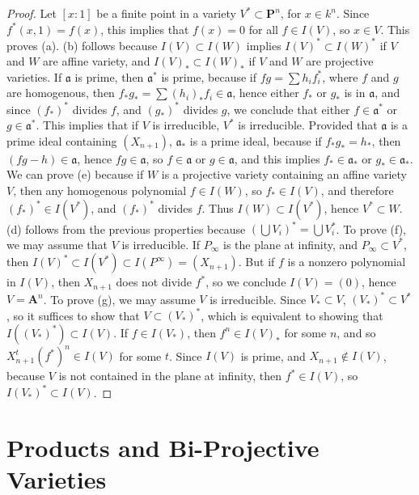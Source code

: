 \begin{proof}
    Let $[x:1]$ be a finite point in a variety $V^* \subset \mathbf{P}^n$, for $x \in k^n$. Since $f^*(x,1) = f(x)$, this implies that $f(x) = 0$ for all $f \in I(V)$, so $x \in V$. This proves (a). (b) follows because $I(V) \subset I(W)$ implies $I(V)^* \subset I(W)^*$ if $V$ and $W$ are affine variety, and $I(V)_* \subset I(W)_*$ if $V$ and $W$ are projective varieties. If $\mathfrak{a}$ is prime, then $\mathfrak{a}^*$ is prime, because if $fg = \sum h_i f_i^*$, where $f$ and $g$ are homogenous, then $f_*g_* = \sum (h_i)_* f_i \in \mathfrak{a}$, hence either $f_*$ or $g_*$ is in $\mathfrak{a}$, and since $(f_*)^*$ divides $f$, and $(g_*)^*$ divides $g$, we conclude that either $f \in \mathfrak{a}^*$ or $g \in \mathfrak{a}^*$. This implies that if $V$ is irreducible, $V^*$ is irreducible. Provided that $\mathfrak{a}$ is a prime ideal containing $(X_{n+1})$, $\mathfrak{a}_*$ is a prime ideal, because if $f_*g_* = h_*$, then $(fg - h) \in \mathfrak{a}$, hence $fg \in \mathfrak{a}$, so $f \in \mathfrak{a}$ or $g \in \mathfrak{a}$, and this implies $f_* \in \mathfrak{a}_*$ or $g_* \in \mathfrak{a}_*$. We can prove (e) because if $W$ is a projective variety containing an affine variety $V$, then any homogenous polynomial $f \in I(W)$, so $f_* \in I(V)$, and therefore $(f_*)^* \in I(V^*)$, and $(f_*)^*$ divides $f$. Thus $I(W) \subset I(V^*)$, hence $V^* \subset W$. (d) follows from the previous properties because $(\bigcup V_i)^* = \bigcup V_i^*$. To prove (f), we may assume that $V$ is irreducible. If $P_\infty$ is the plane at infinity, and $P_\infty \subset V^*$, then $I(V)^* \subset I(V^*) \subset I(P^\infty) = (X_{n+1})$. But if $f$ is a nonzero polynomial in $I(V)$, then $X_{n+1}$ does not divide $f^*$, so we conclude $I(V) = (0)$, hence $V = \mathbf{A}^n$. To prove (g), we may assume $V$ is irreducible. Since $V_* \subset V$, $(V_*)^* \subset V^*$, so it suffices to show that $V \subset (V_*)^*$, which is equivalent to showing that $I((V_*)^*) \subset I(V)$. If $f \in I(V_*)$, then $f^n \in I(V)_*$ for some $n$, and so $X_{n+1}^t(f^*)^n \in I(V)$ for some $t$. Since $I(V)$ is prime, and $X_{n+1} \not \in I(V)$, because $V$ is not contained in the plane at infinity, then $f^* \in I(V)$, so $I(V_*)^* \subset I(V)$.
\end{proof}

\section{Products and Bi-Projective Varieties}

